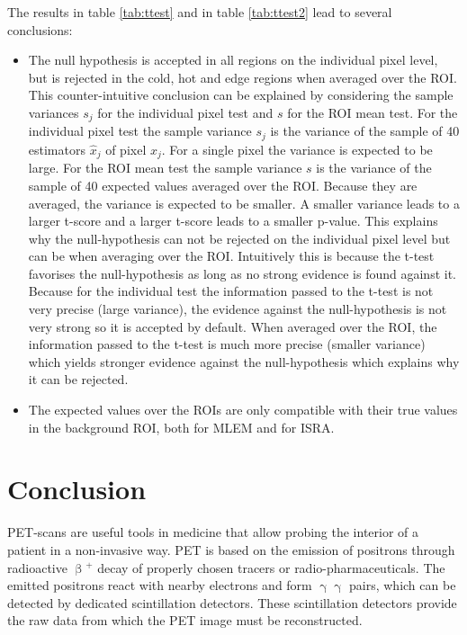 \documentclass[report,12pt]{report}
\newcommand{\superscript}[1]{\ensuremath{^{\textrm{#1}}}}
\begin{document}
The results in table \ref{tab:ttest} and in table \ref{tab:ttest2} lead to several conclusions:
\begin{itemize}
	\item The null hypothesis is accepted in all regions on the individual pixel level, but is rejected in the cold, hot and edge regions when averaged over the ROI. This counter-intuitive conclusion can be explained by considering the sample variances $s_j$ for the individual pixel test and $s$ for the ROI mean test.\newline
	For the individual pixel test the sample variance $s_j$ is the variance of the sample of 40 estimators $\hat x_j$ of pixel $x_j$. For a single pixel the variance is expected to be large.\newline
	For the ROI mean test the sample variance $s$ is the variance of the sample of 40 expected values averaged over the ROI. Because they are averaged, the variance is expected to be smaller.\newline
	A smaller variance leads to a larger t-score and a larger t-score leads to a smaller p-value. This explains why the null-hypothesis can not be rejected on the individual pixel level but can be when averaging over the ROI. Intuitively this is because the t-test favorises the null-hypothesis as long as no strong evidence is found against it. Because for the individual test the information passed to the t-test is not very precise (large variance), the evidence against the null-hypothesis is not very strong so it is accepted by default. When averaged over the ROI, the information passed to the t-test is much more precise (smaller variance) which yields stronger evidence against the null-hypothesis which explains why it can be rejected.
	
	\item The expected values over the ROIs are only compatible with their true values in the background ROI, both for MLEM and for ISRA. 
\end{itemize}


\chapter{Conclusion}
PET-scans are useful tools in medicine that allow probing the interior of a patient in a non-invasive way. PET is based on the emission of positrons through radioactive $\upbeta$\superscript{+} decay of properly chosen tracers or radio-pharmaceuticals. The emitted positrons react with nearby electrons and form $\upgamma\upgamma$ pairs, which can be detected by dedicated scintillation detectors. These scintillation detectors provide the raw data from which the PET image must be reconstructed.\\
\end{document}
